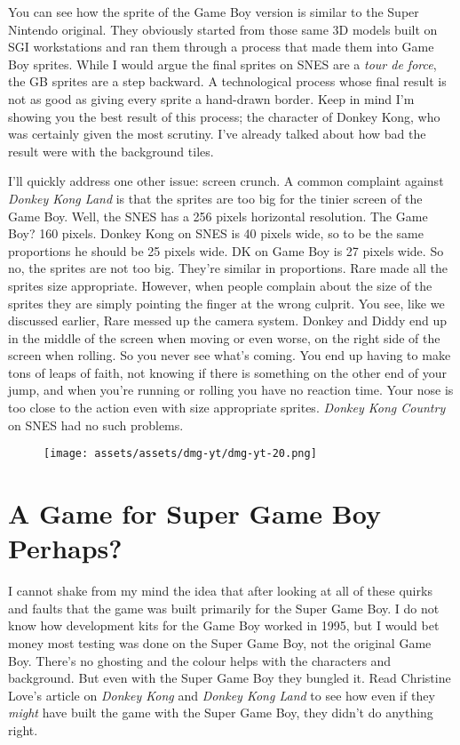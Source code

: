 \documentclass{book}
\begin{document}
You can see how the sprite of the Game Boy version is similar to the Super Nintendo original. They obviously started from those same 3D models built on SGI workstations and ran them through a process that made them into Game Boy sprites. While I would argue the final sprites on SNES are a \emph{tour de force}, the GB sprites are a step backward. A technological process whose final result is not as good as giving every sprite a hand-drawn border. Keep in mind I’m showing you the best result of this process; the character of Donkey Kong, who was certainly given the most scrutiny. I’ve already talked about how bad the result were with the background tiles.

I’ll quickly address one other issue: screen crunch. A common complaint against \emph{Donkey Kong Land} is that the sprites are too big for the tinier screen of the Game Boy. Well, the SNES has a 256 pixels horizontal resolution. The Game Boy? 160 pixels. Donkey Kong on SNES is 40 pixels wide, so to be the same proportions he should be 25 pixels wide. DK on Game Boy is 27 pixels wide. So no, the sprites are not too big. They’re similar in proportions. Rare made all the sprites size appropriate. However, when people complain about the size of the sprites they are simply pointing the finger at the wrong culprit. You see, like we discussed earlier, Rare messed up the camera system. Donkey and Diddy end up in the middle of the screen when moving or even worse, on the right side of the screen when rolling. So you never see what’s coming. You end up having to make tons of leaps of faith, not knowing if there is something on the other end of your jump, and when you’re running or rolling you have no reaction time. Your nose is too close to the action even with size appropriate sprites. \emph{Donkey Kong Country} on SNES had no such problems.

\begin{figure}[hbt]
\vskip 10pt
\centering \texttt{[image: assets/assets/dmg-yt/dmg-yt-20.png]}
\vskip 6pt
\end{figure}

\FloatBarrier\needspace{5pt}\section*{A Game for Super Game Boy Perhaps?}\nopagebreak[4]

I cannot shake from my mind the idea that after looking at all of these quirks and faults that the game was built primarily for the Super Game Boy. I do not know how development kits for the Game Boy worked in 1995, but I would bet money most testing was done on the Super Game Boy, not the original Game Boy. There’s no ghosting and the colour helps with the characters and background. But even with the Super Game Boy they bungled it. Read Christine Love’s article on \emph{Donkey Kong} and \emph{Donkey Kong Land} to see how even if they \emph{might} have built the game with the Super Game Boy, they didn’t do anything right.
\end{document}
